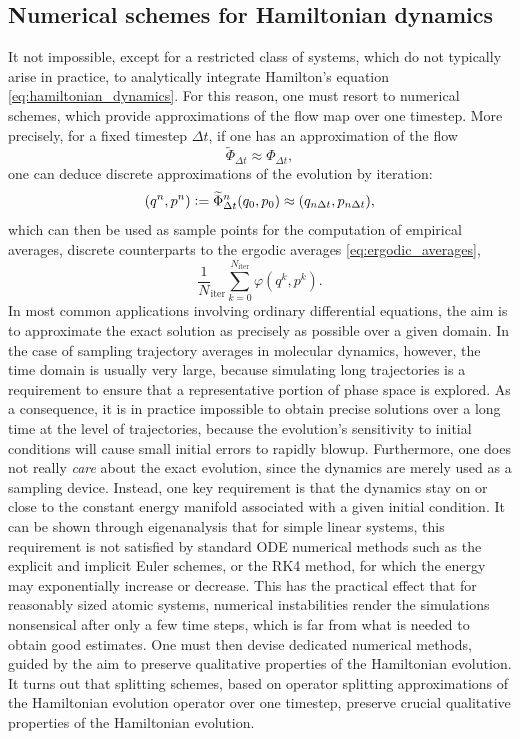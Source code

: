     \subsection{Numerical schemes for Hamiltonian dynamics}

    It not impossible, except for a restricted class of systems, which do not typically arise in practice, to analytically integrate Hamilton's equation \eqref{eq:hamiltonian_dynamics}. For this reason, one must resort to numerical schemes, which provide approximations of the flow map over one timestep.
    More precisely, for a fixed timestep $\Delta t$, if one has an approximation of the flow 
    \[\widetilde{\Phi}_{\Delta t}\approx\Phi_{\Delta t},\]
    one can deduce discrete approximations of the evolution by iteration:
    \begin{equation}\label{eq:discrete_dynamics}(q^n,p^n)\mathrel{\mathop:}= \widetilde{\Phi}_{\Delta t}^n(q_0,p_0)\approx (q_{n\Delta t},p_{n\Delta t}),\end{equation}
    which can then be used as sample points for the computation of empirical averages, discrete counterparts to the ergodic averages \eqref{eq:ergodic_averages},
    \begin{equation}
        \label{eq:discrete_ergodic_averages}
        \frac 1N_{\mathrm{iter}}\sum_{k=0}^{N_{\mathrm{iter}}} \varphi(q^k,p^k).
    \end{equation}
    In most common applications involving ordinary differential equations, the aim is to approximate the exact solution as precisely as possible over a given domain.
    In the case of sampling trajectory averages in molecular dynamics, however, the time domain is usually very large, because simulating long trajectories is a requirement to ensure that a representative portion of phase space is explored. As a consequence, it is in practice impossible to obtain precise solutions over a long time at the level of trajectories, because the evolution's sensitivity to initial conditions will cause small initial errors to rapidly blowup. 
    Furthermore, one does not really \textit{care} about the exact evolution, since the dynamics are merely used as a sampling device. Instead, one key requirement is that the dynamics stay on or close to the constant energy manifold associated with a given initial condition. It can be shown through eigenanalysis that for simple linear systems, this requirement is not satisfied by standard ODE numerical methods such as the explicit and implicit Euler schemes, or the RK4 method, for which the energy may exponentially increase or decrease.
    This has the practical effect that for reasonably sized atomic systems, numerical instabilities render the simulations nonsensical after only a few time steps, which is far from what is needed to obtain good estimates.
    One must then devise dedicated numerical methods, guided by the aim to preserve qualitative properties of the Hamiltonian evolution. It turns out that splitting schemes, based on operator splitting approximations of the Hamiltonian evolution operator over one timestep, preserve crucial qualitative properties of the Hamiltonian evolution.

